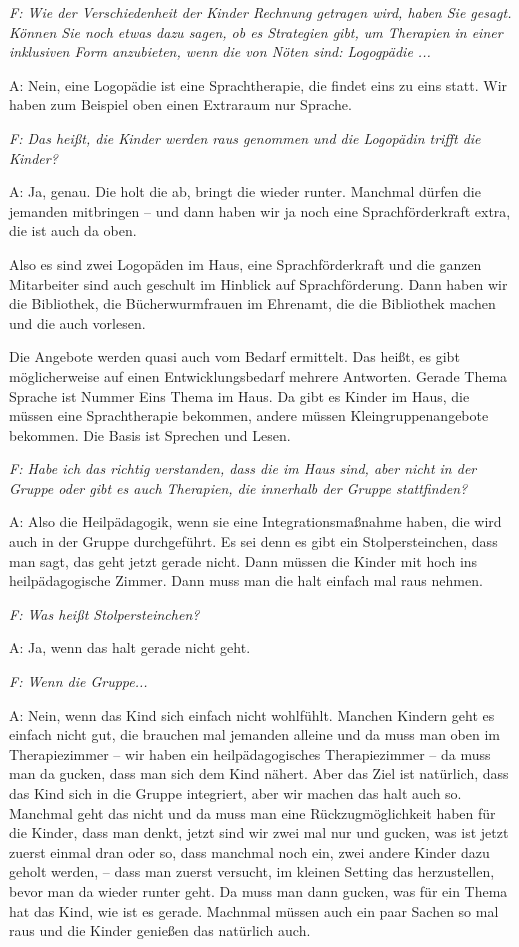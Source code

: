 \begin{linenumbers*}
\emph{F: Wie der Verschiedenheit der Kinder Rechnung getragen wird, haben Sie gesagt. Können Sie noch etwas dazu sagen, ob es Strategien gibt, um Therapien in einer inklusiven Form anzubieten, wenn die von Nöten sind: Logogpädie ...}

A: Nein, eine Logopädie ist eine Sprachtherapie, die findet eins zu eins statt. Wir haben zum Beispiel oben einen Extraraum nur Sprache. 

\emph{F: Das heißt, die Kinder werden raus genommen und die Logopädin trifft die Kinder?}

A: Ja, genau. Die holt die ab, bringt die wieder runter. Manchmal dürfen die jemanden mitbringen -- und dann haben wir ja noch eine Sprachförderkraft extra, die ist auch da oben. 

Also es sind zwei Logopäden im Haus, eine Sprachförderkraft und die ganzen Mitarbeiter sind auch geschult im Hinblick auf Sprachförderung. Dann haben wir die Bibliothek, die Bücherwurmfrauen im Ehrenamt, die die Bibliothek machen und die auch vorlesen. 

Die Angebote werden quasi auch vom Bedarf ermittelt. Das heißt, es gibt möglicherweise auf einen Entwicklungsbedarf mehrere Antworten. Gerade Thema Sprache ist Nummer Eins Thema im Haus. Da gibt es Kinder im Haus, die müssen eine Sprachtherapie bekommen, andere müssen Kleingruppenangebote bekommen. Die Basis ist Sprechen und Lesen.

\emph{F: Habe ich das richtig verstanden, dass die im Haus sind, aber nicht in der Gruppe oder gibt es auch Therapien, die innerhalb der Gruppe stattfinden?} 

A: Also die Heilpädagogik, wenn sie eine Integrationsmaßnahme haben, die wird auch in der Gruppe durchgeführt. Es sei denn es gibt ein Stolpersteinchen, dass man sagt, das geht jetzt gerade nicht. Dann müssen die Kinder mit hoch ins heilpädagogische Zimmer. Dann muss man die halt einfach mal raus nehmen. 

\emph{F: Was heißt Stolpersteinchen?} 

A: Ja, wenn das halt gerade nicht geht. 

\emph{F: Wenn die Gruppe...}

A: Nein, wenn das Kind sich einfach nicht wohlfühlt. Manchen Kindern geht es einfach nicht gut, die brauchen mal jemanden alleine und da muss man oben im Therapiezimmer -- wir haben ein heilpädagogisches Therapiezimmer -- da muss man da gucken, dass man sich dem Kind nähert. Aber das Ziel ist natürlich, dass das Kind sich in die Gruppe integriert, aber wir machen das halt auch so. Manchmal geht das nicht und da muss man eine Rückzugmöglichkeit haben für die Kinder, dass man denkt, jetzt sind wir zwei mal nur und gucken, was ist jetzt zuerst einmal dran oder so, dass manchmal noch ein, zwei andere Kinder dazu geholt werden, -- dass man zuerst versucht, im kleinen Setting das herzustellen, bevor man da wieder runter geht. Da muss man dann gucken, was für ein Thema hat das Kind, wie ist es gerade. Machnmal müssen auch ein paar Sachen so mal raus und die Kinder genießen das natürlich auch. 


\end{linenumbers*}

